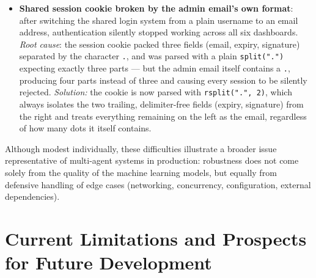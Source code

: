 \documentclass[12pt,a4paper]{report}
\begin{document}
\begin{itemize}[nosep]
\item \textbf{Shared session cookie broken by the admin email's own format}: after switching the shared login system from a plain username to an email address, authentication silently stopped working across all six dashboards. \emph{Root cause}: the session cookie packed three fields (email, expiry, signature) separated by the character \texttt{.}, and was parsed with a plain \texttt{split(".")} expecting exactly three parts --- but the admin email itself contains a \texttt{.}, producing four parts instead of three and causing every session to be silently rejected. \emph{Solution:} the cookie is now parsed with \texttt{rsplit(".", 2)}, which always isolates the two trailing, delimiter-free fields (expiry, signature) from the right and treats everything remaining on the left as the email, regardless of how many dots it itself contains.
\end{itemize}

Although modest individually, these difficulties illustrate a broader issue representative of multi-agent systems in production: robustness does not come solely from the quality of the machine learning models, but equally from defensive handling of edge cases (networking, concurrency, configuration, external dependencies).

\section{Current Limitations and Prospects for Future Development}
\end{document}
